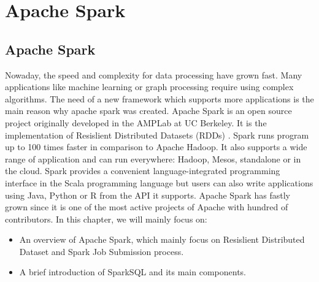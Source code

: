 
\chapter{Apache Spark} %

\label{Chapter2} %



\section{Apache Spark}
Nowaday, the speed and complexity for data processing have grown fast. Many applications like machine learning or graph processing require using complex algorithms. The need of a new framework which supports more applications is the main reason why apache spark was created. Apache Spark is an open source project originally developed in the AMPLab at UC Berkeley. It is the implementation of Resislient Distributed Datasets (RDDs) \cite{matei}. Spark runs program up to 100 times faster in comparison to Apache Hadoop. It also supports a wide range of application and can run everywhere: Hadoop, Mesos, standalone or in the cloud. Spark provides a convenient language-integrated programming interface in the Scala programming language but users can also write applications using Java, Python or R from the API it supports. Apache Spark has fastly grown since it is one of the most active projects of Apache with hundred of contributors. In this chapter, we will mainly focus on:
\begin{itemize}
\item An overview of Apache Spark, which mainly focus on Resislient Distributed Dataset and Spark Job Submission process.
\item A brief introduction of SparkSQL and its main components.
\end{itemize}

	
